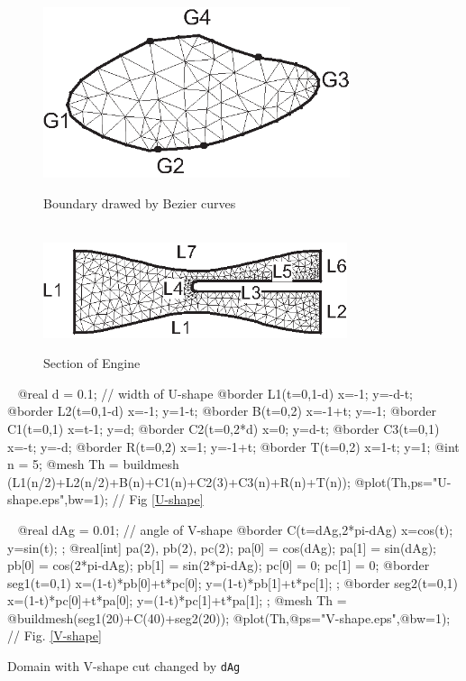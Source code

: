 \documentclass[a4paper,twoside,12pt]{book}
\begin{document}
\begin{figure}[hbt]
\begin{multicols}{2}
\begin{center}
\includegraphics*[height=5cm]{Bezier}
\caption{\label{Bezier} Boundary drawed by Bezier curves}
\end{center}
\begin{center}
\vspace{3cm}~~\\
\includegraphics*[height=2.8cm]{Engine}
\caption{\label{Engine} Section of Engine}
\end{center}
\end{multicols}
\end{figure}

\begin{example}~
\bFF
@real d = 0.1; // width of U-shape
@border L1(t=0,1-d) { x=-1; y=-d-t; }
@border L2(t=0,1-d) { x=-1; y=1-t; }
@border B(t=0,2) { x=-1+t; y=-1; }
@border C1(t=0,1) { x=t-1; y=d; }
@border C2(t=0,2*d) { x=0; y=d-t; }
@border C3(t=0,1) { x=-t; y=-d; }
@border R(t=0,2) { x=1; y=-1+t; }
@border T(t=0,2) { x=1-t; y=1; }
@int n = 5;
@mesh Th = buildmesh (L1(n/2)+L2(n/2)+B(n)+C1(n)+C2(3)+C3(n)+R(n)+T(n));
@plot(Th,ps="U-shape.eps",bw=1); // Fig \ref{U-shape}
\eFF
\end{example}
\begin{example}~
\bFF
@real dAg = 0.01; // angle of V-shape
@border C(t=dAg,2*pi-dAg) { x=cos(t); y=sin(t); };
@real[int] pa(2), pb(2), pc(2);
pa[0] = cos(dAg); pa[1] = sin(dAg);
pb[0] = cos(2*pi-dAg); pb[1] = sin(2*pi-dAg);
pc[0] = 0; pc[1] = 0;
@border seg1(t=0,1) { x=(1-t)*pb[0]+t*pc[0]; y=(1-t)*pb[1]+t*pc[1]; };
@border seg2(t=0,1) { x=(1-t)*pc[0]+t*pa[0]; y=(1-t)*pc[1]+t*pa[1]; };
@mesh Th = @buildmesh(seg1(20)+C(40)+seg2(20));
@plot(Th,@ps="V-shape.eps",@bw=1);  // Fig. \ref{V-shape}
\eFF
\end{example}
{Domain with V-shape cut changed by \texttt{dAg}}
\end{document}
